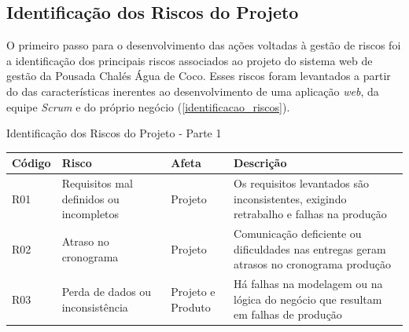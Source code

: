 \documentclass[
	12pt,				%
	openany,			%
	twoside,			%
	a4paper,			%
	english,			%
	french,				%
	spanish,			%
	brazil				%
	]{abntex2}
\begin{document}
\subsection{Identificação dos Riscos do Projeto}
O primeiro passo para o desenvolvimento das ações voltadas à gestão de riscos foi a identificação dos principais riscos associados ao projeto do sistema web de gestão da Pousada Chalés Água de Coco. Esses riscos foram levantados a partir do das características inerentes ao desenvolvimento de uma aplicação \textit{web}, da equipe \textit{Scrum} e do próprio negócio (\autoref{identificacao_riscos}).
\begin{quadro}[H]
	\caption{Identificação dos Riscos do Projeto - Parte 1} \label{identificacao_riscos_1} 
	\begin{tabular}{|p{2.8cm}|p{5cm}|p{3cm}|p{4.2cm}|}
	\hline
	\textbf{Código} & \textbf{Risco} & \textbf{Afeta} & \textbf{Descrição}  \\
	\hline
			R01 & Requisitos mal definidos ou incompletos &
			Projeto  & Os requisitos levantados são inconsistentes, exigindo retrabalho e falhas na produção \\
		\hline
			R02 & Atraso no cronograma &
			Projeto  & Comunicação deficiente ou dificuldades nas entregas geram atrasos no cronograma produção \\
		\hline
			R03 & Perda de dados ou inconsistência &
			Projeto e Produto  & Há falhas na modelagem ou na lógica do negócio que resultam em falhas de produção \\ \hline
\end{tabular}
\end{quadro}		
			
\end{document}
